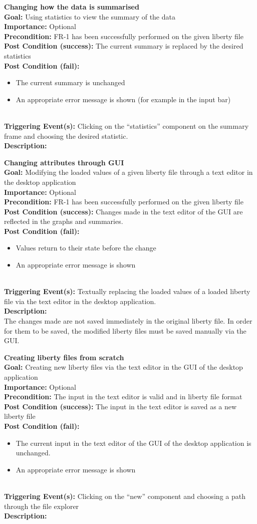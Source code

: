 \documentclass[10pt,a4paper]{report}
\newcommand{\FRODescription}[8]{
    \textbf{#1} \leavevmode \\
    \textbf{Goal: } #2 \leavevmode \\
    \textbf{Importance: } #3 \leavevmode \\
    \textbf{Precondition: } #4 \leavevmode \\
    \textbf{Post Condition (success): } #5 \leavevmode \\
    \textbf{Post Condition (fail): } #6 \leavevmode \\
    \textbf{Triggering Event(s): } #7 \leavevmode \\
    \textbf{Description: } \leavevmode \\
    #8}
\begin{document}
\begin{FRO}
    \item \FRODescription{Changing how the data is summarised}
    {Using statistics to view the summary of the data}
    {Optional}
    {FR-1 has been successfully performed on the given liberty file}
    {The current summary is replaced by the desired statistics}
    {\begin{itemize}
        \item The current summary is unchanged
        \item An appropriate error message is shown (for example in the input bar)
    \end{itemize}}
    {Clicking on the “statistics” component on the summary frame and choosing the desired statistic.}
    \item \FRODescription{Changing attributes through GUI}
    {Modifying the loaded values of a given liberty file through a text editor in the desktop application}
    {Optional}
    {FR-1 has been successfully performed on the given liberty file}
    {Changes made in the text editor of the GUI are reflected in the graphs and summaries.}
    {\begin{itemize}
        \item Values return to their state before the change
        \item An appropriate error message is shown
    \end{itemize}}
    {Textually replacing the loaded values of a loaded liberty file via the text editor in the desktop application.}
    {The changes made are not saved immediately in the original liberty file. In order for them to be saved, the modified liberty files must be saved manually via the GUI.}
    \item \FRODescription{Creating liberty files from scratch}
    {Creating new liberty files via the text editor in the GUI of the desktop application}
    {Optional}
    {The input in the text editor is valid and in liberty file format}
    {The input in the text editor is saved as a new liberty file}
    {\begin{itemize}
        \item The current input in the text editor of the GUI of the desktop application is unchanged.
        \item An appropriate error message is shown
    \end{itemize}}
    {Clicking on the “new” component and choosing a path through the file explorer}
    \item {}

\end{FRO}
\end{document}
